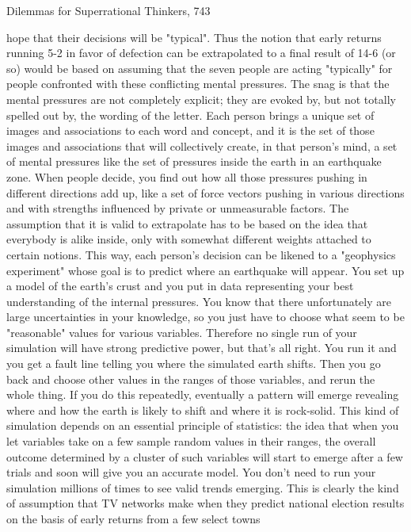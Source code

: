 Dilemmas for Superrational Thinkers,                                                  743

hope that their decisions will be "typical". Thus the notion that early returns running
5-2 in favor of defection can be extrapolated to a final result of 14-6 (or so) would be
based on assuming that the seven people are acting "typically" for people confronted
with these conflicting mental pressures.
        The snag is that the mental pressures are not completely explicit; they are
evoked by, but not totally spelled out by, the wording of the letter. Each person brings
a unique set of images and associations to each word and concept, and it is the set of
those images and associations that will collectively create, in that person's mind, a set
of mental pressures like the set of pressures inside the earth in an earthquake zone.
When people decide, you find out how all those pressures pushing in different
directions add up, like a set of force vectors pushing in various directions and with
strengths influenced by private or unmeasurable factors. The assumption that it is
valid to extrapolate has to be based on the idea that everybody is alike inside, only
with somewhat different weights attached to certain notions.
        This way, each person's decision can be likened to a "geophysics experiment"
whose goal is to predict where an earthquake will appear. You set up a model of the
earth's crust and you put in data representing your best understanding of the internal
pressures. You know that there unfortunately are large uncertainties in your
knowledge, so you just have to choose what seem to be "reasonable" values for
various variables. Therefore no single run of your simulation will have strong
predictive power, but that's all right. You run it and you get a fault line telling you
where the simulated earth shifts. Then you go back and choose other values in the
ranges of those variables, and rerun the whole thing. If you do this repeatedly,
eventually a pattern will emerge revealing where and how the earth is likely to shift
and where it is rock-solid.
        This kind of simulation depends on an essential principle of statistics: the idea
that when you let variables take on a few sample random values in their ranges, the
overall outcome determined by a cluster of such variables will start to emerge after a
few trials and soon will give you an accurate model. You don't need to run your
simulation millions of times to see valid trends emerging.
        This is clearly the kind of assumption that TV networks make when they
predict national election results on the basis of early returns from a few select towns
